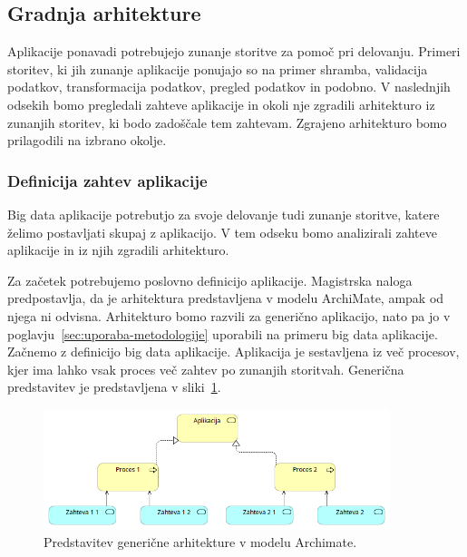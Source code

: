 \subsection{Gradnja arhitekture}

Aplikacije ponavadi potrebujejo zunanje storitve za
pomoč pri delovanju.
Primeri storitev, ki jih zunanje aplikacije ponujajo so na primer
shramba, validacija podatkov, transformacija podatkov, pregled podatkov in podobno.
V naslednjih odsekih bomo pregledali zahteve aplikacije
in okoli nje zgradili arhitekturo iz zunanjih storitev, ki bodo zadoščale tem zahtevam.
Zgrajeno arhitekturo bomo prilagodili na izbrano okolje.

\subsubsection{Definicija zahtev aplikacije}

Big data aplikacije potrebutjo za svoje delovanje
tudi zunanje storitve, katere želimo postavljati skupaj z
aplikacijo.
V tem odseku bomo analizirali zahteve aplikacije in
iz njih zgradili arhitekturo.

Za začetek potrebujemo poslovno definicijo aplikacije.
Magistrska naloga predpostavlja, da je arhitektura
predstavljena v modelu ArchiMate, ampak od njega ni odvisna.
Arhitekturo bomo razvili za generično aplikacijo,
nato pa jo v poglavju~\ref{sec:uporaba-metodologije} uporabili
na primeru big data aplikacije.
Začnemo z definicijo big data aplikacije.
Aplikacija je sestavljena iz več procesov, kjer ima lahko
vsak proces več zahtev po zunanjih storitvah.
Generična predstavitev je predstavljena v sliki~\ref{fig:generic-arch-application}.

\begin{figure}[H]
    \centering
    \includegraphics[width=0.9\textwidth]{img/gradnja/generic-arch-application.png}
    \caption{Predstavitev generične arhitekture v modelu Archimate.}
    \label{fig:generic-arch-application}
\end{figure}

